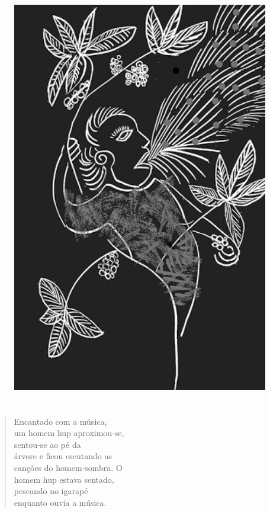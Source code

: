 \begin{figure}
\vspace*{-1.2cm}
\hspace*{-2.2cm}\includegraphics[width=138mm]{./imgs/img1.jpg}
\end{figure}

\chapter*{}

\mbox{}\vspace*{\fill}

\begin{verse}
Encantado com a música,\\
um homem hup aproximou-se,\\
sentou-se ao pé da\\
árvore e ficou escutando as\\
canções do homem-sombra. O\\
homem hup estava sentado,\\
pescando no igarapé\\
enquanto ouvia a música.
\end{verse}

